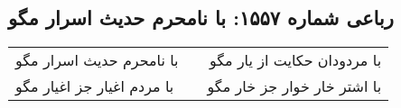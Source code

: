 \begin{center}
\section*{رباعی شماره ۱۵۵۷: با نامحرم حدیث اسرار مگو}
\label{sec:1557}
\begin{longtable}{l p{0.5cm} r}
با نامحرم حدیث اسرار مگو
&&
با مردودان حکایت از یار مگو
\\
با مردم اغیار جز اغیار مگو
&&
با اشتر خار خوار جز خار مگو
\\
\end{longtable}
\end{center}
